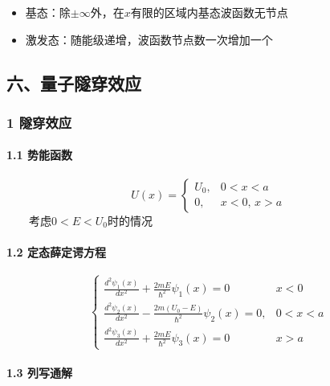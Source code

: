 \documentclass[UTF8,twocolumn]{ctexart}
\providecommand{\tightlist}{%
  \setlength{\itemsep}{0pt}\setlength{\parskip}{0pt}}
\let\oldparagraph\paragraph
\renewcommand{\paragraph}[1]{\oldparagraph{#1}\mbox{}}
\begin{document}
\begin{itemize}
\tightlist
\item
  基态：除\(\pm\infty\)外，在\(x\)有限的区域内基态波函数无节点
\item
  激发态：随能级递增，波函数节点数一次增加一个
\end{itemize}

\hypertarget{ux516dux91cfux5b50ux96a7ux7a7fux6548ux5e94}{%
\subsection{六、量子隧穿效应}\label{ux516dux91cfux5b50ux96a7ux7a7fux6548ux5e94}}

\hypertarget{ux96a7ux7a7fux6548ux5e94}{%
\subsubsection{1 隧穿效应}\label{ux96a7ux7a7fux6548ux5e94}}

\hypertarget{ux52bfux80fdux51fdux6570-2}{%
\paragraph{{ }1.1 势能函数}\label{ux52bfux80fdux51fdux6570-2}}

\[U(x)=\begin{cases} 
        U_0, & 0<x<a\\
        0, & x<0,\,x>a
\end{cases}\]   考虑\(0<E<U_0\)时的情况

\hypertarget{ux5b9aux6001ux859bux5b9aux8c14ux65b9ux7a0b-4}{%
\paragraph{{ }1.2
定态薛定谔方程}\label{ux5b9aux6001ux859bux5b9aux8c14ux65b9ux7a0b-4}}

\[\begin{cases} 
        \frac{d^2\psi_1(x)}{dx^2}+\frac{2mE}{\hbar^2}\psi_1(x)=0 & x<0\\
        \frac{d^2\psi_2(x)}{dx^2}-\frac{2m(U_0-E)}{\hbar^2}\psi_2(x)=0, & 0<x<a\\
        \frac{d^2\psi_3(x)}{dx^2}+\frac{2mE}{\hbar^2}\psi_3(x)=0 & x>a
\end{cases}\]

\hypertarget{ux5217ux5199ux901aux89e3-2}{%
\paragraph{{ }1.3 列写通解}\label{ux5217ux5199ux901aux89e3-2}}
\end{document}
